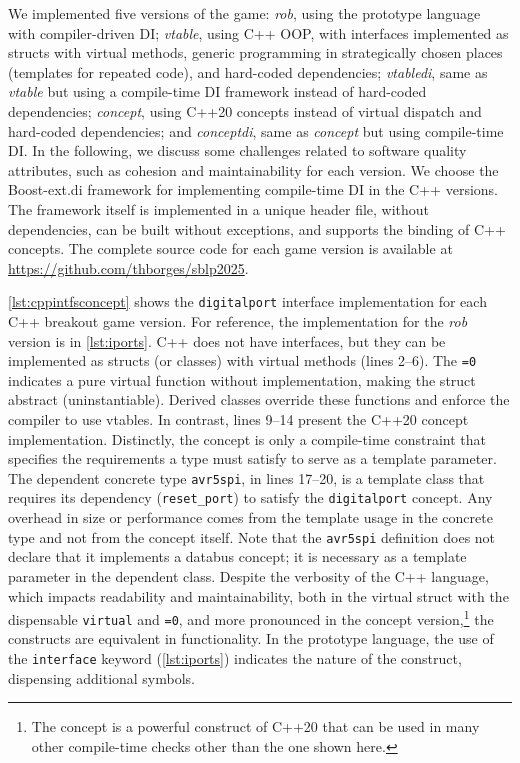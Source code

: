 \documentclass[10pt,sigplan,screen,anonymous]{acmart}
\newcommand{\blindreview}[1]{#1}
\begin{document}
We implemented five versions of the game: \emph{rob}, using the prototype language with compiler-driven DI; \emph{vtable}, using C++ OOP, with interfaces implemented as structs with virtual methods, generic programming in strategically chosen places (templates for repeated code), and hard-coded dependencies; \emph{vtabledi}, same as \emph{vtable} but using a compile-time DI framework \cite{boostdi2018} instead of hard-coded dependencies; \emph{concept}, using C++20 concepts instead of virtual dispatch and hard-coded dependencies; and \emph{conceptdi}, same as \emph{concept} but using compile-time DI. In the following, we discuss some challenges related to software quality attributes, such as cohesion and maintainability for each version. We choose the Boost-ext.di framework \cite{boostdi2018} for implementing compile-time DI in the C++ versions. The framework itself is implemented in a unique header file, without dependencies, can be built without exceptions, and supports the binding of C++ concepts. The complete source code for each game version is available at \blindreview{\url{https://github.com/thborges/sblp2025}}.


\autoref{lst:cppintfsconcept} shows the {\tt digitalport} interface implementation for each C++ breakout game version. For reference, the implementation for the \emph{rob} version is in \autoref{lst:iports}. C++ does not have interfaces, but they can be implemented as structs (or classes) with virtual methods (lines 2--6). The {\tt =0} indicates a pure virtual function without implementation, making the struct abstract (uninstantiable). Derived classes override these functions and enforce the compiler to use vtables. In contrast, lines 9--14 present the C++20 concept implementation. Distinctly, the concept is only a compile-time constraint that specifies the requirements a type must satisfy to serve as a template parameter. The dependent concrete type {\tt avr5spi}, in lines 17--20, is a template class that requires its dependency ({\tt reset\_port}) to satisfy the {\tt digitalport} concept. Any overhead in size or performance comes from the template usage in the concrete type and not from the concept itself. Note that the {\tt avr5spi} definition does not declare that it implements a databus concept; it is necessary as a template parameter in the dependent class. Despite the verbosity of the C++ language, which impacts readability and maintainability, both in the virtual struct with the dispensable {\tt virtual} and {\tt =0}, and more pronounced in the concept version,\footnote{The concept is a powerful construct of C++20 that can be used in many other compile-time checks other than the one shown here.} the constructs are equivalent in functionality. In the prototype language, the use of the {\tt interface} keyword (\autoref{lst:iports}) indicates the nature of the construct, dispensing additional symbols.
\end{document}
